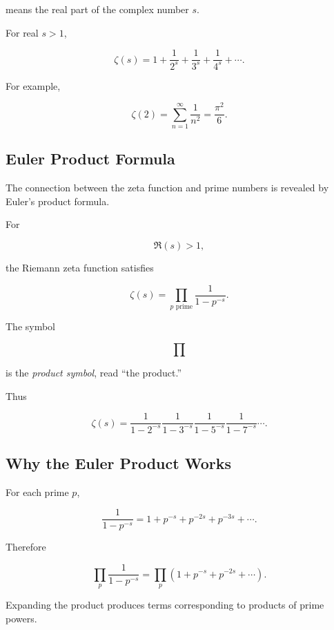 means the real part of the complex number \(s\).

For real \(s>1\),

\[ \zeta(s)=1+\frac1{2^s}+\frac1{3^s}+\frac1{4^s}+\cdots. \]

For example,

\[ \zeta(2)=\sum_{n=1}^{\infty}\frac1{n^2}=\frac{\pi^2}{6}. \]

\subsection{Euler Product Formula}
\label{subsec:euler-product-formula}

The connection between the zeta function and prime numbers is revealed by
Euler's product formula.

\begin{theorem}
For

\[ \Re(s)>1, \]

the Riemann zeta function satisfies

\[ \boxed{\zeta(s)=\prod_{p\text{ prime}}\frac{1}{1-p^{-s}}.} \]
\end{theorem}

The symbol

\[ \prod \]

is the \emph{product symbol}, read ``the product.''

Thus

\[
\zeta(s)
=
\frac{1}{1-2^{-s}}
\frac{1}{1-3^{-s}}
\frac{1}{1-5^{-s}}
\frac{1}{1-7^{-s}}
\cdots.
\]

\subsection{Why the Euler Product Works}
\label{subsec:euler-product-explanation}

For each prime \(p\),

\[ \frac{1}{1-p^{-s}}=1+p^{-s}+p^{-2s}+p^{-3s}+\cdots. \]

Therefore

\[
\prod_p\frac{1}{1-p^{-s}}
=
\prod_p
\left(
1+p^{-s}+p^{-2s}+\cdots
\right).
\]

Expanding the product produces terms corresponding to products of prime
powers.

